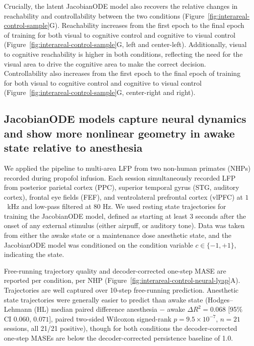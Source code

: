 Crucially, the latent JacobianODE model also recovers the relative changes in reachability and controllability between the two conditions (Figure~\ref{fig:interareal-control-sample}G). Reachability increases from the first epoch to the final epoch of training for both visual to cognitive control and cognitive to visual control (Figure~\ref{fig:interareal-control-sample}G, left and center-left). Additionally, visual to cognitive reachability is higher in both conditions, reflecting the need for the visual area to drive the cognitive area to make the correct decision. Controllability also increases from the first epoch to the final epoch of training for both visual to cognitive control and cognitive to visual control (Figure~\ref{fig:interareal-control-sample}G, center-right and right).

\subsection{JacobianODE models capture neural dynamics and show more nonlinear geometry in awake state relative to anesthesia}
\label{sec:interareal-control-nhp-trajectory}

We applied the pipeline to multi-area LFP from two non-human primates (NHPs) recorded during propofol infusion. Each session simultaneously recorded LFP from posterior parietal cortex (PPC), superior temporal gyrus (STG, auditory cortex), frontal eye fields (FEF), and ventrolateral prefrontal cortex (vlPFC) at $1$~kHz and low-pass filtered at 80 Hz. We used resting state trajectories for training the JacobianODE model, defined as starting at least 3 seconds after the onset of any external stimulus (either airpuff, or auditory tone). Data was taken from either the awake state or a maintenance dose anesthetic state, and the JacobianODE model was conditioned on the condition variable $c \in \{-1, +1\}$, indicating the state.

Free-running trajectory quality and decoder-corrected one-step MASE are reported per condition, per NHP (Figure~\ref{fig:interareal-control-neural-lyap}A). Trajectories are well captured over 10-step free-running prediction. Anesthetic state trajectories were generally easier to predict than awake state (Hodges--Lehmann (HL) median paired difference anesthesia $-$ awake $\Delta R^{2}=0.068$ [95\% CI $0.060$, $0.071$], paired two-sided Wilcoxon signed-rank $p=9.5\!\times\!10^{-7}$, $n=21$ sessions, all 21/21 positive), though for both conditions the decoder-corrected one-step MASEs are below the decoder-corrected persistence baseline of 1.0.

